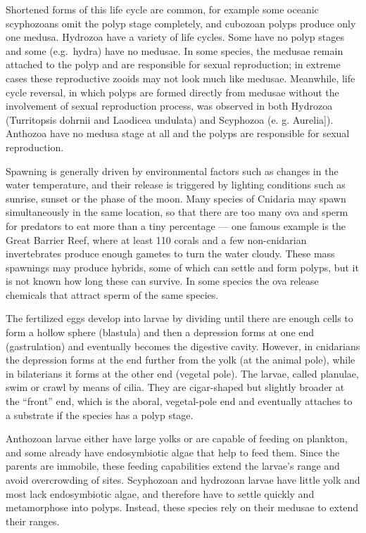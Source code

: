 \documentclass[]{book}
\theoremstyle{definition}
\theoremstyle{definition}
\theoremstyle{definition}
\theoremstyle{remark}
\begin{document}
Shortened forms of this life cycle are common, for example some oceanic
scyphozoans omit the polyp stage completely, and cubozoan polyps produce
only one medusa. Hydrozoa have a variety of life cycles. Some have no
polyp stages and some (e.g.~hydra) have no medusae. In some species, the
medusae remain attached to the polyp and are responsible for sexual
reproduction; in extreme cases these reproductive zooids may not look
much like medusae. Meanwhile, life cycle reversal, in which polyps are
formed directly from medusae without the involvement of sexual
reproduction process, was observed in both Hydrozoa (Turritopsis dohrnii
and Laodicea undulata) and Scyphozoa (e. g. Aurelia{]}). Anthozoa have
no medusa stage at all and the polyps are responsible for sexual
reproduction.

Spawning is generally driven by environmental factors such as changes in
the water temperature, and their release is triggered by lighting
conditions such as sunrise, sunset or the phase of the moon. Many
species of Cnidaria may spawn simultaneously in the same location, so
that there are too many ova and sperm for predators to eat more than a
tiny percentage --- one famous example is the Great Barrier Reef, where
at least 110 corals and a few non-cnidarian invertebrates produce enough
gametes to turn the water cloudy. These mass spawnings may produce
hybrids, some of which can settle and form polyps, but it is not known
how long these can survive. In some species the ova release chemicals
that attract sperm of the same species.

The fertilized eggs develop into larvae by dividing until there are
enough cells to form a hollow sphere (blastula) and then a depression
forms at one end (gastrulation) and eventually becomes the digestive
cavity. However, in cnidarians the depression forms at the end further
from the yolk (at the animal pole), while in bilaterians it forms at the
other end (vegetal pole). The larvae, called planulae, swim or crawl by
means of cilia. They are cigar-shaped but slightly broader at the
``front'' end, which is the aboral, vegetal-pole end and eventually
attaches to a substrate if the species has a polyp stage.

Anthozoan larvae either have large yolks or are capable of feeding on
plankton, and some already have endosymbiotic algae that help to feed
them. Since the parents are immobile, these feeding capabilities extend
the larvae's range and avoid overcrowding of sites. Scyphozoan and
hydrozoan larvae have little yolk and most lack endosymbiotic algae, and
therefore have to settle quickly and metamorphose into polyps. Instead,
these species rely on their medusae to extend their ranges.
\end{document}
